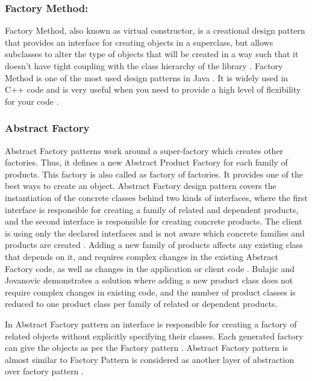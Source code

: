 \documentclass[sigplan,12pt,nonacm=true,review=false]{acmart}
\begin{document}
\subsubsection{Factory Method: }
Factory Method, also known as virtual constructor, is a creational design pattern that provides an interface for creating objects in a superclass, but allows subclasses to alter the type of objects that will be created \cite{noauthor_factory_nodate} in a way such that it doesn’t have tight coupling with the class hierarchy of the library \cite{noauthor_design_2015-1}. Factory Method is one of the most used design patterns in Java \cite{noauthor_design_nodate-2}. It is widely used in C++ code and is very useful when you need to provide a high level of flexibility for your code \cite{noauthor_design_nodate-3}.

\subsubsection{Abstract Factory}
Abstract Factory patterns work around a super-factory which creates other factories. Thus, it defines a new Abstract Product Factory for each family of products. This factory is also called as factory of factories. It provides one of the best ways to create an object. Abstract Factory design pattern covers the instantiation of the concrete classes behind two kinds of interfaces, where the first interface is responsible for creating a family of related and dependent products, and the second interface is responsible for creating concrete products. The client is using only the declared interfaces and is not aware which concrete families and products are created \cite{bulajic_approach_2012}. Adding a new family of products affects any existing class that depends on it, and requires complex changes in the existing Abstract Factory code, as well as changes in the application or client code \cite{bulajic_approach_2012}. Bulajic and Jovanovic \cite{bulajic_approach_2012}  demonstrates a solution where adding a new product class does not require complex changes in existing code, and the number of product classes is reduced to one product class per family of related or dependent products.

In Abstract Factory pattern an interface is responsible for creating a factory of related objects without explicitly specifying their classes. Each generated factory can give the objects as per the Factory pattern \cite{noauthor_design_nodate-1}. Abstract Factory pattern is almost similar to Factory Pattern is considered as another layer of abstraction over factory pattern \cite{noauthor_abstract_2017}. 
\end{document}

